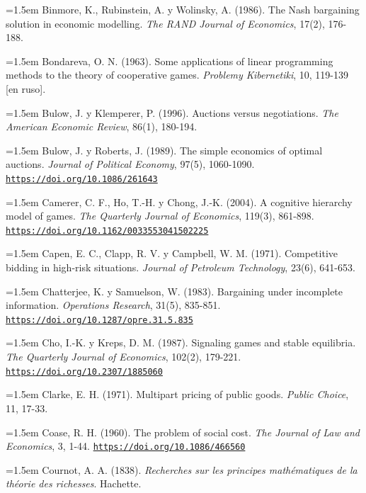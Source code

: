 \documentclass[10pt,a4paper]{article}
\begin{document}
\noindent\hangindent=1.5em Binmore, K., Rubinstein, A. y Wolinsky, A. (1986). The Nash bargaining solution in economic modelling. \textit{The RAND Journal of Economics}, 17(2), 176-188.

\noindent\hangindent=1.5em Bondareva, O. N. (1963). Some applications of linear programming methods to the theory of cooperative games. \textit{Problemy Kibernetiki}, 10, 119-139 [en ruso].

\noindent\hangindent=1.5em Bulow, J. y Klemperer, P. (1996). Auctions versus negotiations. \textit{The American Economic Review}, 86(1), 180-194.

\noindent\hangindent=1.5em Bulow, J. y Roberts, J. (1989). The simple economics of optimal auctions. \textit{Journal of Political Economy}, 97(5), 1060-1090. \href{https://doi.org/10.1086/261643}{\nolinkurl{https://doi.org/10.1086/261643}}

\noindent\hangindent=1.5em Camerer, C. F., Ho, T.-H. y Chong, J.-K. (2004). A cognitive hierarchy model of games. \textit{The Quarterly Journal of Economics}, 119(3), 861-898. \href{https://doi.org/10.1162/0033553041502225}{\nolinkurl{https://doi.org/10.1162/0033553041502225}}

\noindent\hangindent=1.5em Capen, E. C., Clapp, R. V. y Campbell, W. M. (1971). Competitive bidding in high-risk situations. \textit{Journal of Petroleum Technology}, 23(6), 641-653.

\noindent\hangindent=1.5em Chatterjee, K. y Samuelson, W. (1983). Bargaining under incomplete information. \textit{Operations Research}, 31(5), 835-851. \href{https://doi.org/10.1287/opre.31.5.835}{\nolinkurl{https://doi.org/10.1287/opre.31.5.835}}

\noindent\hangindent=1.5em Cho, I.-K. y Kreps, D. M. (1987). Signaling games and stable equilibria. \textit{The Quarterly Journal of Economics}, 102(2), 179-221. \href{https://doi.org/10.2307/1885060}{\nolinkurl{https://doi.org/10.2307/1885060}}

\noindent\hangindent=1.5em Clarke, E. H. (1971). Multipart pricing of public goods. \textit{Public Choice}, 11, 17-33.

\noindent\hangindent=1.5em Coase, R. H. (1960). The problem of social cost. \textit{The Journal of Law and Economics}, 3, 1-44. \href{https://doi.org/10.1086/466560}{\nolinkurl{https://doi.org/10.1086/466560}}

\noindent\hangindent=1.5em Cournot, A. A. (1838). \textit{Recherches sur les principes mathématiques de la théorie des richesses}. Hachette.
\end{document}

